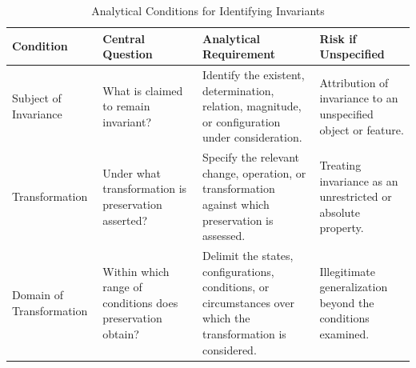 
%
%

\begin{table}[htbp]
    \centering
    \small
    \renewcommand{\arraystretch}{1.4}
    \setlength{\tabcolsep}{5pt}

    \caption{Analytical Conditions for Identifying Invariants}
    \label{tab:defining-invariants}

    \begin{tabular}{
        p{2.7cm}
        p{3.4cm}
        p{4.0cm}
        p{3.1cm}
    }
        \hline
        \textbf{Condition}
        &
        \textbf{Central Question}
        &
        \textbf{Analytical Requirement}
        &
        \textbf{Risk if Unspecified}
        \\
        \hline

        Subject of Invariance
        &
        What is claimed to remain invariant?
        &
        Identify the existent, determination, relation, magnitude,
        or configuration under consideration.
        &
        Attribution of invariance to an unspecified object or feature.
        \\
        \hline

        Transformation
        &
        Under what transformation is preservation asserted?
        &
        Specify the relevant change, operation, or transformation
        against which preservation is assessed.
        &
        Treating invariance as an unrestricted or absolute property.
        \\
        \hline

        Domain of Transformation
        &
        Within which range of conditions does preservation obtain?
        &
        Delimit the states, configurations, conditions, or circumstances
        over which the transformation is considered.
        &
        Illegitimate generalization beyond the conditions examined.
        \\
        \hline


\end{tabular}
\end{table}
